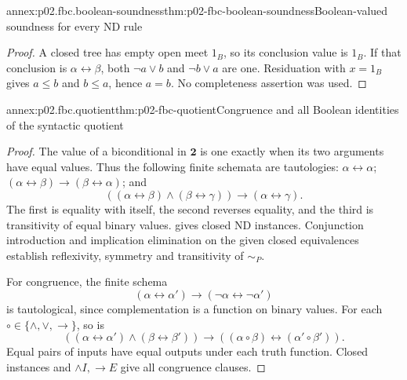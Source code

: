 \begin{annexitem}{annex:p02.fbc.boolean-soundness}{thm:p02-fbc-boolean-soundness}{Boolean-valued soundness for every ND rule}
\begin{proof}
A closed tree has empty open meet \(1_B\), so its conclusion value
is \(1_B\). If that conclusion is \(\alpha\leftrightarrow\beta\),
both \(\neg a\vee b\) and \(\neg b\vee a\) are one.
Residuation with \(x=1_B\) gives \(a\leq b\) and \(b\leq a\),
hence \(a=b\). No completeness assertion was used.
\end{proof}
\end{annexitem}

\begin{annexitem}{annex:p02.fbc.quotient}{thm:p02-fbc-quotient}{Congruence and all Boolean identities of the syntactic quotient}
\begin{proof}
The value of a biconditional in \(\mathbf2\) is one exactly when
its two arguments have equal values. Thus the following finite schemata
are tautologies: \(\alpha\leftrightarrow\alpha\);
\((\alpha\leftrightarrow\beta)\to(\beta\leftrightarrow\alpha)\);
and
\[
 ((\alpha\leftrightarrow\beta)\land
   (\beta\leftrightarrow\gamma))
       \to(\alpha\leftrightarrow\gamma).
\]
The first is equality with itself, the second reverses equality,
and the third is transitivity of equal binary values.
 gives closed ND instances.
Conjunction introduction and implication elimination on the given
closed equivalences establish reflexivity, symmetry and transitivity
of \(\sim_P\).

For congruence, the finite schema
\[
 (\alpha\leftrightarrow\alpha')
                 \to(\neg\alpha\leftrightarrow\neg\alpha')
\]
is tautological, since complementation is a function on binary values.
For each \(\circ\in\{\land,\lor,\to\}\), so is
\[
 ((\alpha\leftrightarrow\alpha')\land
   (\beta\leftrightarrow\beta'))
       \to((\alpha\circ\beta)\leftrightarrow
                              (\alpha'\circ\beta')).
\]
Equal pairs of inputs have equal outputs under each truth function.
Closed instances and \(\land I,\to E\) give all congruence clauses.


\end{proof}
\end{annexitem}
